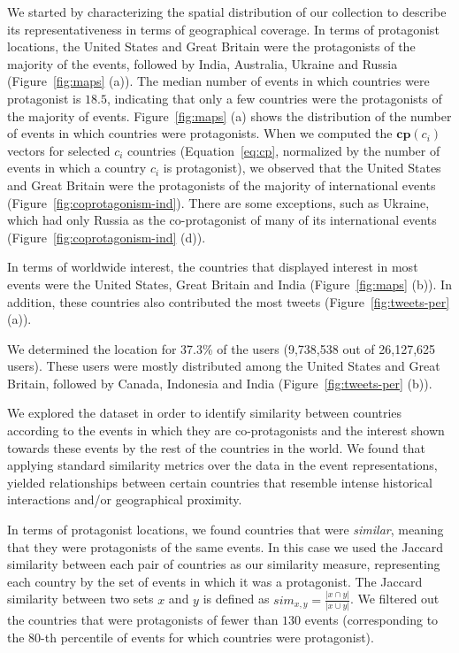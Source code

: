 We started by characterizing the spatial distribution of our collection to
describe its representativeness in terms of geographical coverage. 
%
In terms of protagonist locations, the United States and Great Britain were the
protagonists of the majority of the events, followed by India, Australia,
Ukraine and Russia (Figure~\ref{fig:maps} (a)). 
%
The median number of events in which countries were protagonist is $18.5$,
indicating that only a few countries were the protagonists of the majority of
events. 
%
Figure~\ref{fig:maps} (a) shows the distribution of the number of events in
which countries were protagonists. 
%
When we computed the $\mathbf{cp}(c_i)$ vectors for selected $c_i$ countries
(Equation~\ref{eq:cp}, normalized by the number of events in which a country
$c_i$ is protagonist), we observed that the United States and Great Britain were
the protagonists of the majority of international events
(Figure~\ref{fig:coprotagonism-ind}). 
%
There are some exceptions, such as Ukraine, which had only Russia as the
co-protagonist of many of its international events
(Figure~\ref{fig:coprotagonism-ind} (d)).


In terms of worldwide interest, the countries that displayed interest in most
events were the United States, Great Britain and India (Figure~\ref{fig:maps}
(b)).  
%
In addition, these countries also contributed the most tweets
(Figure~\ref{fig:tweets-per} (a)).

We determined the location for 37.3\% of the users (9,738,538 out of 26,127,625
users). 
%
These users were mostly distributed among the United States and Great Britain,
followed by Canada, Indonesia and India (Figure~\ref{fig:tweets-per} (b)).

\medskip
{}
We explored the dataset in order to identify similarity between countries
according to the events in which they are co-protagonists and the interest shown
towards these events by the rest of the countries in the world. 
%
We found that applying standard similarity metrics over the data in the event
representations, yielded relationships between certain countries that resemble
intense historical interactions and/or geographical proximity.

In terms of protagonist locations, we found countries that were {\em similar},
meaning that they were protagonists of the same events. 
%
In this case we used the Jaccard similarity between each pair of countries as
our similarity measure, representing each country by the set of events in which
it was a protagonist. 
%
The Jaccard similarity between two sets $x$ and $y$ is defined as $sim_{x, y} =
\frac{|x \cap y|}{|x \cup y|}$.
%
We filtered out the countries that were protagonists of fewer than $130$ events
(corresponding to the 80-th percentile of events for which countries were
protagonist). \\

